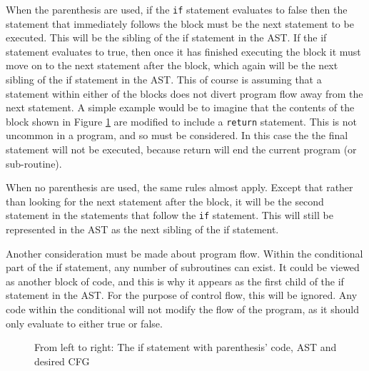 When the parenthesis are used, if the \verb|if| statement evaluates to false then the statement that immediately follows the block must be the next statement to be executed. This will be the sibling of the if statement in the AST. If the if statement evaluates to true, then once it has finished executing the block it must move on to the next statement after the block, which again will be the next sibling of the if statement in the AST. This of course is assuming that a statement within either of the blocks does not divert program flow away from the next statement. A simple example would be to imagine that the contents of the block shown in Figure \ref{fig:if} are modified to include a \verb|return| statement. This is not uncommon in a program, and so must be considered. In this case the the final statement will not be executed, because return will end the current program (or sub-routine).

When no parenthesis are used, the same rules almost apply. Except that rather than looking for the next statement after the block, it will be the second statement in the statements that follow the \verb|if| statement. This will still be represented in the AST as the next sibling of the if statement.

Another consideration must be made about program flow. Within the conditional part of the if statement, any number of subroutines can exist. It could be viewed as another block of code, and this is why it appears as the first child of the if statement in the AST. For the purpose of control flow, this will be ignored. Any code within the conditional will not modify the flow of the program, as it should only evaluate to either true or false.

\begin{figure}
\centering
\begin{minipage}{.3\textwidth}
  \centering
  
\end{minipage}%
\begin{minipage}{.3\textwidth}
  \centering
\end{minipage}
\begin{minipage}{.3\textwidth}
  \centering
\end{minipage}
\caption{From left to right: The if statement with parenthesis' code, AST and desired CFG}
\label{fig:if}
\end{figure}

